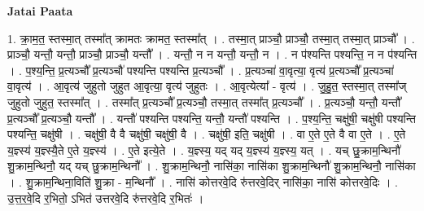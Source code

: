 \documentclass[17pt]{extarticle}
\begin{document}
\textbf{Jatai Paata} \newline

1. क्रा॒म॒त॒ स्तस्मा॒त् तस्मा᳚त् क्रामतः क्रामत॒ स्तस्मा᳚त् । . तस्मा॒त् प्राञ्चौ॒ प्राञ्चौ॒ तस्मा॒त् तस्मा॒त् प्राञ्चौ᳚ । . प्राञ्चौ॒ यन्तौ॒ यन्तौ॒ प्राञ्चौ॒ प्राञ्चौ॒ यन्तौ᳚ । . यन्तौ॒ न न यन्तौ॒ यन्तौ॒ न । . न प॑श्यन्ति पश्यन्ति॒ न न प॑श्यन्ति । . प॒श्य॒न्ति॒ प्र॒त्यञ्चौ᳚ प्र॒त्यञ्चौ॑ पश्यन्ति पश्यन्ति प्र॒त्यञ्चौ᳚ । . प्र॒त्यञ्चा॑ वा॒वृत्या॒ वृत्य॑ प्र॒त्यञ्चौ᳚ प्र॒त्यञ्चा॑ वा॒वृत्य॑ । . आ॒वृत्य॑ जुहुतो जुहुत आ॒वृत्या॒ वृत्य॑ जुहुतः । . आ॒वृत्येत्या᳚ - वृत्य॑ । . जु॒हु॒त॒ स्तस्मा॒त् तस्मा᳚ज् जुहुतो जुहुत॒ स्तस्मा᳚त् । . तस्मा᳚त् प्र॒त्यञ्चौ᳚ प्र॒त्यञ्चौ॒ तस्मा॒त् तस्मा᳚त् प्र॒त्यञ्चौ᳚ । . प्र॒त्यञ्चौ॒ यन्तौ॒ यन्तौ᳚ प्र॒त्यञ्चौ᳚ प्र॒त्यञ्चौ॒ यन्तौ᳚ । . यन्तौ॑ पश्यन्ति पश्यन्ति॒ यन्तौ॒ यन्तौ॑ पश्यन्ति । . प॒श्य॒न्ति॒ चक्षु॑षी॒ चक्षु॑षी पश्यन्ति पश्यन्ति॒ चक्षु॑षी । . चक्षु॑षी॒ वै वै चक्षु॑षी॒ चक्षु॑षी॒ वै । . चक्षु॑षी॒ इति॒ चक्षु॑षी । . वा ए॒ते ए॒ते वै वा ए॒ते । . ए॒ते य॒ज्ञ्स्य॑ य॒ज्ञ्स्यै॒ते ए॒ते य॒ज्ञ्स्य॑ । . ए॒ते इत्ये॒ते । . य॒ज्ञ्स्य॒ यद् यद् य॒ज्ञ्स्य॑ य॒ज्ञ्स्य॒ यत् । . यच् छु॒क्राम॒न्थिनौ॑ शु॒क्राम॒न्थिनौ॒ यद् यच् छु॒क्राम॒न्थिनौ᳚ । . शु॒क्राम॒न्थिनौ॒ नासि॑का॒ नासि॑का शु॒क्राम॒न्थिनौ॑ शु॒क्राम॒न्थिनौ॒ नासि॑का । . शु॒क्राम॒न्थिना॒विति॑ शु॒क्रा - म॒न्थिनौ᳚ । . नासि॑ कोत्तरवे॒दि रु॑त्तरवे॒दिर् नासि॑का॒ नासि॑ कोत्तरवे॒दिः । . उ॒त्त॒र॒वे॒दि र॒भितो॒ ऽभित॑ उत्तरवे॒दि रु॑त्तरवे॒दि र॒भितः॑ । \newline
\end{document}
